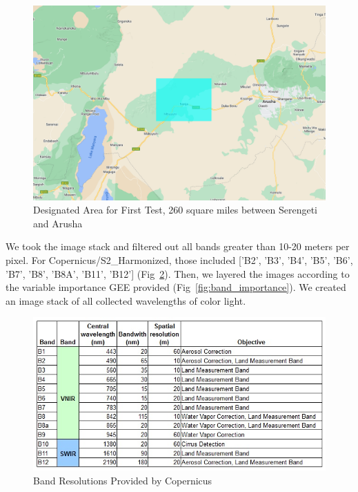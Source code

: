 \documentclass[10pt]{article}
\begin{document}
\begin{figure} [H]
    \centering
    \includegraphics[width=1\linewidth]{images/studyarea.png}
    \caption{Designated Area for First Test, 260 square miles between Serengeti and Arusha}
    \label{fig:designated_area}
\end{figure}

We took the image stack and filtered out all bands greater than 10-20 meters per pixel. For Copernicus/S2\_Harmonized, those included ['B2', 'B3', 'B4', 'B5', 'B6', 'B7', 'B8', 'B8A', 'B11', 'B12'] (Fig~\ref{fig:cop_bands_chart}). Then, we layered the images according to the variable importance GEE provided (Fig~\ref{fig:band_importance}). We created an image stack of all collected wavelengths of color light.

\begin{figure} [H]
    \centering
    \includegraphics[width=1\linewidth]{images/copernicus_band_resolution.png}
    \caption{Band Resolutions Provided by Copernicus}
    \label{fig:cop_bands_chart}
\end{figure}
\end{document}
